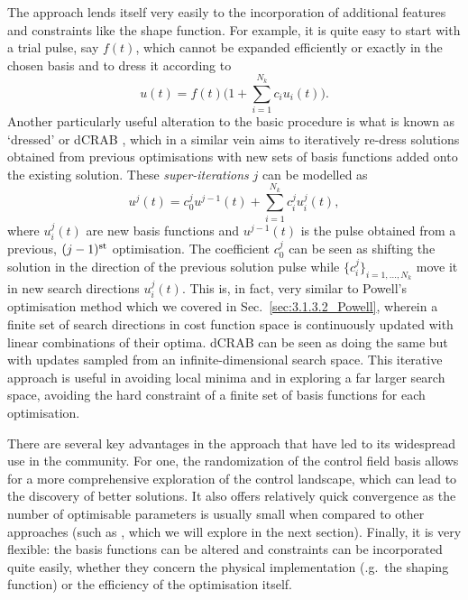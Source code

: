 The  approach lends itself very easily to the incorporation of additional features and constraints like the shape function. For example, it is quite easy to start with a trial pulse, say $f(t)$, which cannot be expanded efficiently or exactly in the chosen basis and to dress it according to
\begin{equation}\label{eq:trial_pulse_CRAB}
    u(t) = f(t)\Bigg(1 + \sum_{i = 1}^{N_k} c_i u_i(t)\Bigg).
\end{equation}
Another particularly useful alteration to the basic  procedure is what is known as `dressed'  or dCRAB \cite{rach_dressing_2015}, which in a similar vein aims to iteratively re-dress solutions obtained from previous optimisations with new sets of basis functions added onto the existing solution. These \emph{super-iterations} $j$ can be modelled as
\begin{equation}\label{eq:dCRAB}
    u^j(t) = c_0^j u^{j-1}(t) + \sum_{i = 1}^{N_k} c_i^j u^j_i(t),
\end{equation}
where $u^j_i(t)$ are new basis functions and $u^{j-1}(t)$ is the pulse obtained from a previous, $(j-1)^{\rm st}$ optimisation. The coefficient $c_0^j$ can be seen as shifting the solution in the direction of the previous solution pulse while $\{ c_i^j\}_{i = 1, ..., N_k}$ move it in new search directions $u^j_i(t)$. This is, in fact, very similar to Powell's optimisation method which we covered in Sec.~\ref{sec:3.1.3.2_Powell}, wherein a finite set of search directions in cost function space is continuously updated with linear combinations of their optima. dCRAB can be seen as doing the same but with updates sampled from an infinite-dimensional search space. This iterative approach is useful in  avoiding local minima and in exploring a far larger search space, avoiding the hard constraint of a finite set of basis functions for each optimisation. 

There are several key advantages in the  approach that have led to its widespread use in the  community. For one, the randomization of the control field basis allows for a more comprehensive exploration of the control landscape, which can lead to the discovery of better solutions. It also offers relatively quick convergence as the number of optimisable parameters is usually small when compared to other approaches (such as , which we will explore in the next section). Finally, it is very flexible: the basis functions can be altered and constraints can be incorporated quite easily, whether they concern the physical implementation (\@e.g.~the shaping function) or the efficiency of the optimisation itself.

